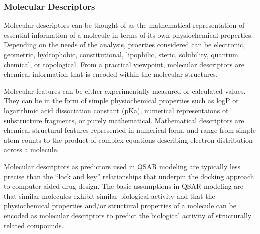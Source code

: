 \subsubsection{Molecular Descriptors}
Molecular descriptors can be thought of as the mathematical representation of essential information of a molecule in terms of its own physiochemical properties. Depending on the needs of the analysis, proerties considered can be electronic, geometric, hydrophobic, constitutional, lipophilic, steric, solubility, quantum chemical, or topological. From a practical viewpoint, molecular descriptors are chemical information that is encoded within the molecular structures. \cite{Nantasenamat2009}


Molecular features can be either experimentally measured or calculated values. They can be in the form of simple physiochemical properties such as logP or logarithmic acid dissociation constant (pKa), numerical representaions of substructure fragments, or purely mathematical. Mathematical descriptors are chemical structural features represented in numerical form, and range from simple atom counts to the product of complex equations describing electron distribution across a molecule.\cite{Kruhlak2012}

Molecular descriptors as predictors used in QSAR modeling are typically less precise than the “lock and key” relationships that underpin the docking approach to computer-aided drug design. The basic assumptions in QSAR modeling are that similar molecules exhibit similar biological activity and that the physiochemical properties and/or structural properties of a molecule can be encoded as molecular descriptors to predict the biological activity of structurally related compounds.

